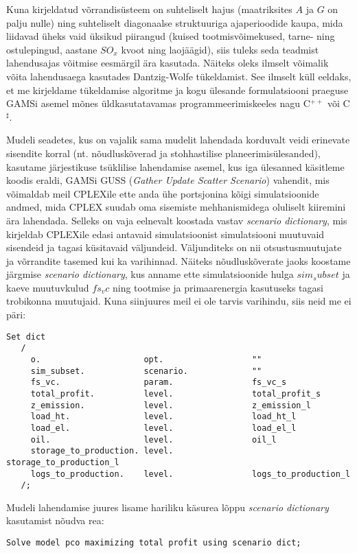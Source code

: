 \documentclass[10pt,a4paper]{article}
\begin{document}
Kuna kirjeldatud võrrandisüsteem on suhteliselt hajus (maatriksites $A$ ja $G$ on palju nulle) ning suhteliselt diagonaalse struktuuriga ajaperioodide kaupa, mida liidavad üheks vaid üksikud piirangud (kuised tootmisvõimekused, tarne- ning ostulepingud, aastane $SO_x$ kvoot ning laojäägid), siis tuleks seda teadmist lahendusajas võitmise eesmärgil ära kasutada. Näiteks oleks ilmselt võimalik võita lahendusaega kasutades Dantzig-Wolfe tükeldamist. See ilmselt küll eeldaks, et me kirjeldame tükeldamise algoritme ja kogu ülesande formulatsiooni praeguse GAMSi asemel mõnes üldkasutatavamas programmeerimiskeeles nagu C$^{++}$ või C$^\sharp$.

Mudeli seadetes, kus on vajalik sama mudelit lahendada korduvalt veidi erinevate sisendite korral (nt. nõudluskõverad ja stohhastilise planeerimisülesanded), kasutame järjestikuse tsüklilise lahendamise asemel, kus iga ülesanned käsitleme koodis eraldi, GAMSi GUSS (\emph{Gather Update Scatter Scenario}) vahendit, mis võimaldab meil CPLEXile ette anda ühe portsjonina kõigi simulatsioonide andmed, mida CPLEX suudab oma sisemiste mehhanismidega oluliselt kiiremini ära lahendada. Selleks on vaja eelnevalt koostada vastav \emph{scenario dictionary}, mis kirjeldab CPLEXile edasi antavaid simulatsioonist simulatsiooni muutuvaid sisendeid ja tagasi küsitavaid väljundeid. Väljunditeks on nii otsustusmuutujate ja võrrandite tasemed kui ka varihinnad. Näiteks nõudluskõverate jaoks koostame järgmise \emph{scenario dictionary}, kus anname ette simulatsioonide hulga $sim_subset$ ja kaeve muutuvkulud $fs_vc$ ning tootmise ja primaarenergia kasutuseks tagasi trobikonna muutujaid. Kuna siinjuures meil ei ole tarvis varihindu, siis neid me ei päri:

\begin{verbatim}
Set dict
   /
     o.                     opt.                  ""
     sim_subset.            scenario.             ""
     fs_vc.                 param.                fs_vc_s
     total_profit.          level.                total_profit_s
     z_emission.            level.                z_emission_l
     load_ht.               level.                load_ht_l
     load_el.               level.                load_el_l
     oil.                   level.                oil_l
     storage_to_production. level.                storage_to_production_l
     logs_to_production.    level.                logs_to_production_l
   /;
\end{verbatim}
Mudeli lahendamise juures lisame hariliku käsurea lõppu \emph{scenario dictionary} kasutamist nõudva rea:
\begin{verbatim}
Solve model pco maximizing total profit using scenario dict;
\end{verbatim}
\end{document}
